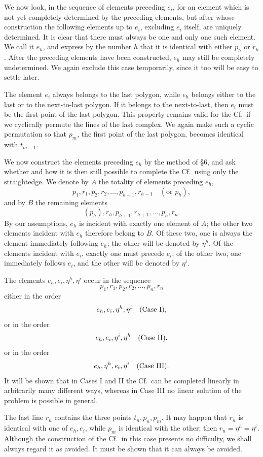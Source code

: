 \documentclass[11pt]{article}
\newcommand{\Cf}{\textup{Cf.}}
\begin{document}
We now look, in the sequence of elements preceding $e_i$, for an element which is not yet completely determined by the preceding elements, but after whose construction the following elements up to $e_i$, excluding $e_i$ itself, are uniquely determined. It is clear that there must always be one and only one such element. We call it $e_h$, and express by the number $h$ that it is identical with either $p_h$ or $r_h$. After the preceding elements have been constructed, $e_h$ may still be completely undetermined. We again exclude this case temporarily, since it too will be easy to settle later.

The element $e_i$ always belongs to the last polygon, while $e_h$ belongs either to the last or to the next-to-last polygon. If it belongs to the next-to-last, then $e_i$ must be the first point of the last polygon. This property remains valid for the \Cf\ if we cyclically permute the lines of the last complex. We again make such a cyclic permutation so that $p_m$, the first point of the last polygon, becomes identical with $t_{m-1}$.

We now construct the elements preceding $e_h$ by the method of \S 6, and ask whether and how it is then still possible to complete the \Cf\ using only the straightedge. We denote by $A$ the totality of elements preceding $e_h$,
\[
p_1,r_1,p_2,r_2,\ldots,p_{h-1},r_{h-1}\quad(\text{or }p_h),
\]
and by $B$ the remaining elements
\[
(p_h),r_h,p_{h+1},r_{h+1},\ldots,p_n,r_n.
\]
By our assumptions, $e_h$ is incident with exactly one element of $A$; the other two elements incident with $e_h$ therefore belong to $B$. Of these two, one is always the element immediately following $e_h$; the other will be denoted by $\eta^h$. Of the elements incident with $e_i$, exactly one must precede $e_i$; of the other two, one immediately follows $e_i$, and the other will be denoted by $\eta^i$.

The elements $e_h,e_i,\eta^h,\eta^i$ occur in the sequence
\[
p_1,r_1,p_2,r_2,\ldots,p_n,r_n
\]
either in the order
\[
e_h,e_i,\eta^h,\eta^i\quad\hbox{(Case I)},
\]
or in the order
\[
e_h,e_i,\eta^i,\eta^h\quad\hbox{(Case II)},
\]
or in the order
\[
e_h,\eta^h,e_i,\eta^i\quad\hbox{(Case III)}.
\]
It will be shown that in Cases I and II the \Cf\ can be completed linearly in arbitrarily many different ways, whereas in Case III no linear solution of the problem is possible in general.

The last line $r_n$ contains the three points $t_n,p_n,p_m$. It may happen that $r_n$ is identical with one of $e_h,e_i$, while $p_m$ is identical with the other; then $r_n=\eta^h=\eta^i$. Although the construction of the \Cf\ in this case presents no difficulty, we shall always regard it as avoided. It must be shown that it can always be avoided.
\end{document}
